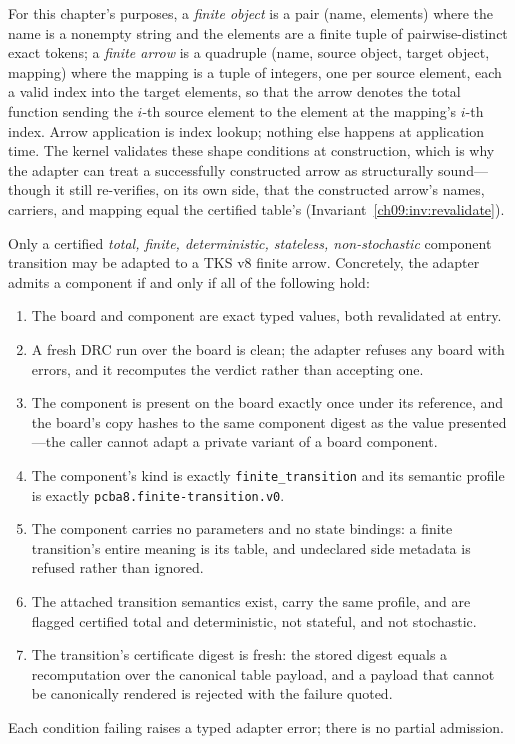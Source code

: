 \begin{definition}\label{ch09:def:kernel}
For this chapter's purposes, a \emph{finite object} is a pair (name, elements) where the name is a nonempty string and the elements are a finite tuple of pairwise-distinct exact tokens; a \emph{finite arrow} is a quadruple (name, source object, target object, mapping) where the mapping is a tuple of integers, one per source element, each a valid index into the target elements, so that the arrow denotes the total function sending the $i$-th source element to the element at the mapping's $i$-th index. Arrow application is index lookup; nothing else happens at application time. The kernel validates these shape conditions at construction, which is why the adapter can treat a successfully constructed arrow as structurally sound---though it still re-verifies, on its own side, that the constructed arrow's names, carriers, and mapping equal the certified table's (Invariant~\ref{ch09:inv:revalidate}).
\end{definition}

\begin{ruleenv}\label{ch09:rule:certified}
Only a certified \emph{total, finite, deterministic, stateless, non-stochastic} component transition may be adapted to a TKS v8 finite arrow. Concretely, the adapter admits a component if and only if all of the following hold:
\begin{enumerate}
\item The board and component are exact typed values, both revalidated at entry.
\item A fresh DRC run over the board is clean; the adapter refuses any board with errors, and it recomputes the verdict rather than accepting one.
\item The component is present on the board exactly once under its reference, and the board's copy hashes to the same component digest as the value presented---the caller cannot adapt a private variant of a board component.
\item The component's kind is exactly \texttt{finite\_transition} and its semantic profile is exactly \texttt{pcba8.finite-transition.v0}.
\item The component carries no parameters and no state bindings: a finite transition's entire meaning is its table, and undeclared side metadata is refused rather than ignored.
\item The attached transition semantics exist, carry the same profile, and are flagged certified total and deterministic, not stateful, and not stochastic.
\item The transition's certificate digest is fresh: the stored digest equals a recomputation over the canonical table payload, and a payload that cannot be canonically rendered is rejected with the failure quoted.
\end{enumerate}
Each condition failing raises a typed adapter error; there is no partial admission.
\end{ruleenv}

